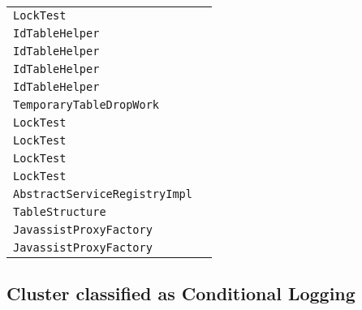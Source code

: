 \begin{center}
\begin{tabular}{ll}
\lstinline/LockTest/&\raisebox{0pt}{\lstinline/testFindWithPessimisticWriteLockTimeoutException()/}\\
\lstinline/IdTableHelper/&\raisebox{0pt}{\lstinline/executeIdTableCreationStatements(List<String>,JdbcServices,JdbcConnectionAccess)/}\\
\lstinline/IdTableHelper/&\raisebox{0pt}{\lstinline/executeIdTableDropStatements(String[],JdbcServices,JdbcConnectionAccess)/}\\
\lstinline/IdTableHelper/&\raisebox{0pt}{\lstinline/executeIdTableDropStatements(String[],JdbcServices,JdbcConnectionAccess)/}\\
\lstinline/IdTableHelper/&\raisebox{0pt}{\lstinline/executeIdTableCreationStatements(List<String>,JdbcServices,JdbcConnectionAccess)/}\\
\lstinline/TemporaryTableDropWork/&\raisebox{0pt}{\lstinline/execute(Connectionconnection)/}\\
\lstinline/LockTest/&\raisebox{0pt}{\lstinline/call()/}\\
\lstinline/LockTest/&\raisebox{0pt}{\lstinline/call()/}\\
\lstinline/LockTest/&\raisebox{0pt}{\lstinline/call()/}\\
\lstinline/LockTest/&\raisebox{0pt}{\lstinline/call()/}\\
\lstinline/AbstractServiceRegistryImpl/&\raisebox{0pt}{\lstinline/applyInjections(Rservice)/}\\
\lstinline/TableStructure/&\raisebox{0pt}{\lstinline/integralDataTypeHolderexecute(Connection)/}\\
\lstinline/JavassistProxyFactory/&\raisebox{0pt}{\lstinline/hibernateProxygetProxy(Serializableid,SharedSession)/}\\
\lstinline/JavassistProxyFactory/&\raisebox{0pt}{\lstinline/hibernateProxydeserializeProxy(Serializable)/}\\
\bottomrule
\end{tabular}
\end{center}



\subsection{Cluster classified as Conditional Logging}


